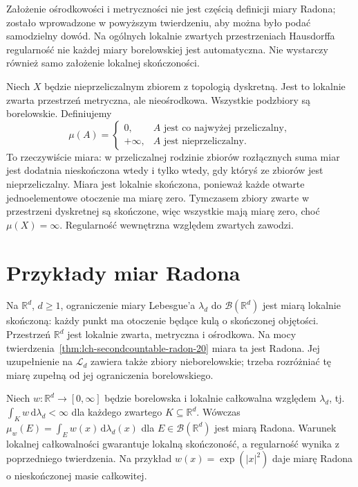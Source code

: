 \begin{uwaga}
Założenie ośrodkowości i metryczności nie jest częścią
definicji miary Radona; zostało wprowadzone w powyższym
twierdzeniu, aby można było podać samodzielny dowód.
Na ogólnych lokalnie zwartych przestrzeniach Hausdorffa
regularność nie każdej miary borelowskiej jest automatyczna.
Nie wystarczy również samo założenie lokalnej skończoności.
\end{uwaga}

\begin{przyklad}
\label{ex:nonradon-discrete-20}
Niech $X$ będzie nieprzeliczalnym zbiorem z topologią
dyskretną. Jest to lokalnie zwarta przestrzeń metryczna,
ale nieośrodkowa. Wszystkie podzbiory są borelowskie.
Definiujemy
\[
\mu(A)=\begin{cases}0,&A\text{ jest co najwyżej przeliczalny},\\
+\infty,&A\text{ jest nieprzeliczalny}.
\end{cases}
\]
To rzeczywiście miara: w przeliczalnej rodzinie zbiorów
rozłącznych suma miar jest dodatnia nieskończona wtedy
i tylko wtedy, gdy któryś ze zbiorów jest nieprzeliczalny.
Miara jest lokalnie skończona, ponieważ każde otwarte
jednoelementowe otoczenie ma miarę zero. Tymczasem
zbiory zwarte w przestrzeni dyskretnej są skończone,
więc wszystkie mają miarę zero, choć $\mu(X)=\infty$.
Regularność wewnętrzna względem zwartych zawodzi.
\end{przyklad}

\section{Przykłady miar Radona}
\begin{przyklad}
Na $\mathbb R^d$, $d\ge1$, ograniczenie miary Lebesgue'a
$\lambda_d$ do $\mathcal B(\mathbb R^d)$ jest miarą
lokalnie skończoną: każdy punkt ma otoczenie będące
kulą o skończonej objętości. Przestrzeń $\mathbb R^d$
jest lokalnie zwarta, metryczna i ośrodkowa.
Na mocy twierdzenia~\ref{thm:lch-secondcountable-radon-20}
miara ta jest Radona. Jej uzupełnienie na
$\mathcal L_d$ zawiera także zbiory nieborelowskie;
trzeba rozróżniać tę miarę zupełną od jej ograniczenia
borelowskiego.
\end{przyklad}

\begin{przyklad}
Niech $w:\mathbb R^d\to[0,\infty]$ będzie borelowska
i lokalnie całkowalna względem $\lambda_d$,
tj. $\int_Kw\,\mathrm d\lambda_d<\infty$ dla każdego
zwartego $K\subseteq\mathbb R^d$. Wówczas
$\mu_w(E)=\int_Ew(x)\,\mathrm d\lambda_d(x)$
dla $E\in\mathcal B(\mathbb R^d)$ jest miarą Radona.
Warunek lokalnej całkowalności gwarantuje lokalną
skończoność, a regularność wynika z poprzedniego
twierdzenia. Na przykład $w(x)=\exp(|x|^2)$ daje miarę
Radona o nieskończonej masie całkowitej.
\end{przyklad}

